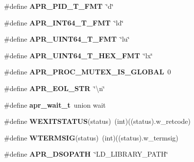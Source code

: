 \begin{DoxyCompactItemize}
\item 
\hypertarget{group__apr__platform_ga6c8e5aeab20eeaed373e3dd65cd33689}{\#define {\bfseries A\-P\-R\-\_\-\-P\-I\-D\-\_\-\-T\-\_\-\-F\-M\-T}~\char`\"{}d\char`\"{}}\label{group__apr__platform_ga6c8e5aeab20eeaed373e3dd65cd33689}

\item 
\hypertarget{group__apr__platform_ga41cc6dfe3d69cd66cffc8aae4b59bd08}{\#define {\bfseries A\-P\-R\-\_\-\-I\-N\-T64\-\_\-\-T\-\_\-\-F\-M\-T}~\char`\"{}ld\char`\"{}}\label{group__apr__platform_ga41cc6dfe3d69cd66cffc8aae4b59bd08}

\item 
\hypertarget{group__apr__platform_ga7fc21e56e167a47d7478600dee7ab502}{\#define {\bfseries A\-P\-R\-\_\-\-U\-I\-N\-T64\-\_\-\-T\-\_\-\-F\-M\-T}~\char`\"{}lu\char`\"{}}\label{group__apr__platform_ga7fc21e56e167a47d7478600dee7ab502}

\item 
\hypertarget{group__apr__platform_ga528bc9f3c6f3500b35e97c4b25566b48}{\#define {\bfseries A\-P\-R\-\_\-\-U\-I\-N\-T64\-\_\-\-T\-\_\-\-H\-E\-X\-\_\-\-F\-M\-T}~\char`\"{}lx\char`\"{}}\label{group__apr__platform_ga528bc9f3c6f3500b35e97c4b25566b48}

\item 
\hypertarget{group__apr__platform_ga90ebe3e3537fdff1e66c6baf4b560de8}{\#define {\bfseries A\-P\-R\-\_\-\-P\-R\-O\-C\-\_\-\-M\-U\-T\-E\-X\-\_\-\-I\-S\-\_\-\-G\-L\-O\-B\-A\-L}~0}\label{group__apr__platform_ga90ebe3e3537fdff1e66c6baf4b560de8}

\item 
\hypertarget{group__apr__platform_ga20953ff75ca59692aac949acfdaa25f6}{\#define {\bfseries A\-P\-R\-\_\-\-E\-O\-L\-\_\-\-S\-T\-R}~\char`\"{}\textbackslash{}n\char`\"{}}\label{group__apr__platform_ga20953ff75ca59692aac949acfdaa25f6}

\item 
\hypertarget{group__apr__platform_ga13fae72fec73474a6b35ed86b9104bf5}{\#define {\bfseries apr\-\_\-wait\-\_\-t}~union wait}\label{group__apr__platform_ga13fae72fec73474a6b35ed86b9104bf5}

\item 
\hypertarget{group__apr__platform_ga77f17ed4771a558a0f16e5f3aecee222}{\#define {\bfseries W\-E\-X\-I\-T\-S\-T\-A\-T\-U\-S}(status)~(int)((status).w\-\_\-retcode)}\label{group__apr__platform_ga77f17ed4771a558a0f16e5f3aecee222}

\item 
\hypertarget{group__apr__platform_ga94ec02a12424092a8391069adcd2ff73}{\#define {\bfseries W\-T\-E\-R\-M\-S\-I\-G}(status)~(int)((status).w\-\_\-termsig)}\label{group__apr__platform_ga94ec02a12424092a8391069adcd2ff73}

\item 
\hypertarget{group__apr__platform_ga2eb8121bd28ad578c3cbca3a68f6d823}{\#define {\bfseries A\-P\-R\-\_\-\-D\-S\-O\-P\-A\-T\-H}~\char`\"{}L\-D\-\_\-\-L\-I\-B\-R\-A\-R\-Y\-\_\-\-P\-A\-T\-H\char`\"{}}\label{group__apr__platform_ga2eb8121bd28ad578c3cbca3a68f6d823}

\end{DoxyCompactItemize}
